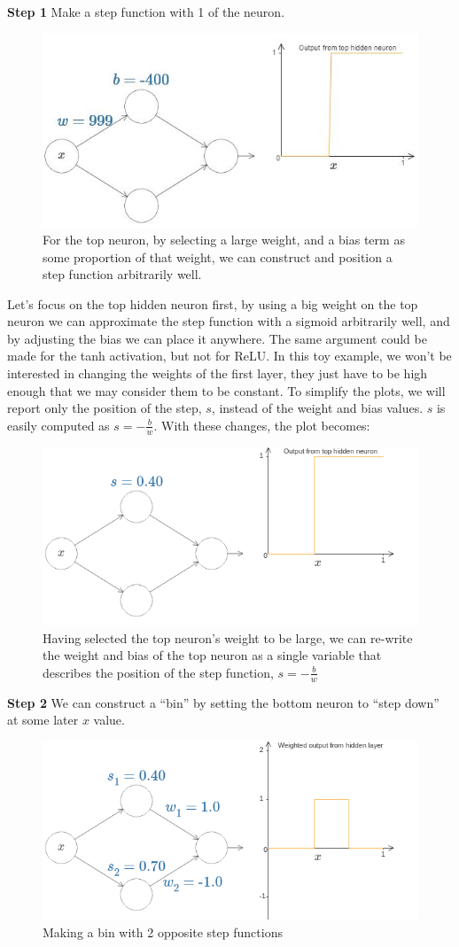 \documentclass{article}
\begin{document}
\textbf{Step 1} Make a step function with 1 of the neuron.
\begin{figure}[H]
    \centering
    \includegraphics[width=.6\textwidth]{figures/high_weight_function.jpg}
    \caption{For the top neuron, by selecting a large weight, and a bias term as some proportion of that weight, we can construct and position a step function arbitrarily well.}
\end{figure}
Let's focus on the top hidden neuron first, by using a big weight on the top neuron we can approximate the step function with a sigmoid arbitrarily well, and by adjusting the bias we can place it anywhere.
The same argument could be made for the tanh activation, but not for ReLU. In this toy example, we won't be interested in changing the weights of the first layer, they just have to be high enough that we may consider them to be constant. To simplify the plots, we will report only the position of the step, $s$, instead of the weight and bias values. $s$ is easily computed as $s = -\frac{b}{w}$. With these changes, the plot becomes:
\begin{figure}[H]
    \centering
    \includegraphics[width=.6\textwidth]{figures/2nn_s.png}
    \caption{Having selected the top neuron's weight to be large, we can re-write the weight and bias of the top neuron as a single variable that describes the position of the step function, $s = -\frac{b}{w}$}
\end{figure}

\textbf{Step 2} We can construct a ``bin'' by setting the bottom neuron to ``step down'' at some later $x$ value.
\begin{figure}[H]
    \centering
    \includegraphics[width=.6\textwidth]{figures/bin.png}
    \caption{Making a bin with 2 opposite step functions}
\end{figure}
\end{document}
